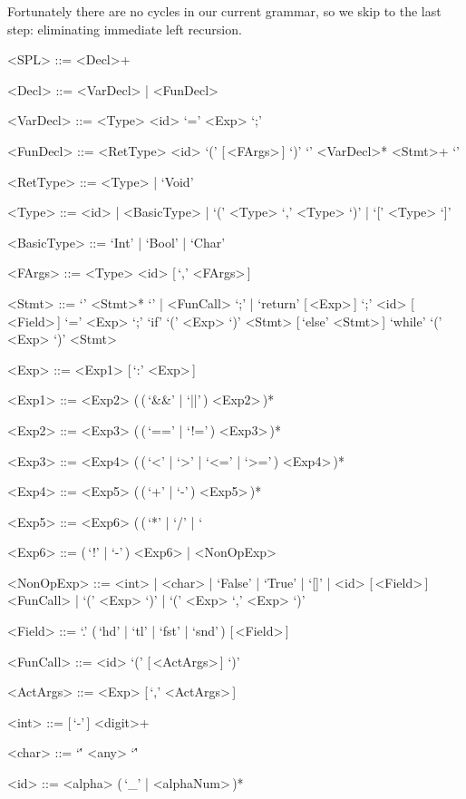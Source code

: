 \documentclass{article}
\begin{document}
Fortunately there are no cycles in our current grammar, so we skip to the last step: eliminating immediate left recursion.
\begin{grammar}
    <SPL> ::= <Decl>+

    <Decl> ::= <VarDecl> | <FunDecl>

    <VarDecl> ::= <Type> <id> `=' <Exp> `;'

    <FunDecl> ::= <RetType> <id> `(' [\,<FArgs>\,] `)' `{' <VarDecl>* <Stmt>+ `}'

    <RetType> ::= <Type> | `Void'

    <Type> ::= <id> | <BasicType> | `(' <Type> `,' <Type> `)' | `[' <Type> `]'

    <BasicType> ::= `Int' | `Bool' | `Char'

    <FArgs> ::= <Type> <id> [\,`,' <FArgs>\,]

    <Stmt> ::= `{' <Stmt>* `}' | <FunCall> `;' | `return' [\,<Exp>\,] `;'
    \alt <id> [\,<Field>\,] `=' <Exp> `;'
    \alt `if' `(' <Exp> `)' <Stmt> [\,`else' <Stmt>\,]
    \alt `while' `(' <Exp> `)' <Stmt>

    <Exp> ::= <Exp1> [\,`:' <Exp>\,]

    <Exp1> ::= <Exp2> (\,(\,`&&' | `||'\,) <Exp2>\,)*

    <Exp2> ::= <Exp3> (\,(\,`==' | `!='\,) <Exp3>\,)*

    <Exp3> ::= <Exp4> (\,(\,`<' | `>' | `<=' | `>='\,) <Exp4>\,)*

    <Exp4> ::= <Exp5> (\,(\,`+' | `-'\,) <Exp5>\,)*

    <Exp5> ::= <Exp6> (\,(\,`*' | `/' | `%

    <Exp6> ::= (\,`!' | `-'\,) <Exp6> | <NonOpExp>

    <NonOpExp> ::= <int> | <char> | `False' | `True' | `[]' | <id> [\,<Field>\,]
    \alt <FunCall> | `(' <Exp> `)' | `(' <Exp> `,' <Exp> `)'

    <Field> ::= `.' (\,`hd' | `tl' | `fst' | `snd'\,) [\,<Field>\,]

    <FunCall> ::= <id> `(' [\,<ActArgs>\,] `)'

    <ActArgs> ::= <Exp> [\,`,' <ActArgs>\,]

    <int> ::= [\,`-'\,] <digit>+

    <char> ::= `\'' <any> `\''

    <id> ::= <alpha> (\,`_' | <alphaNum>\,)*
\end{grammar}
\end{document}
